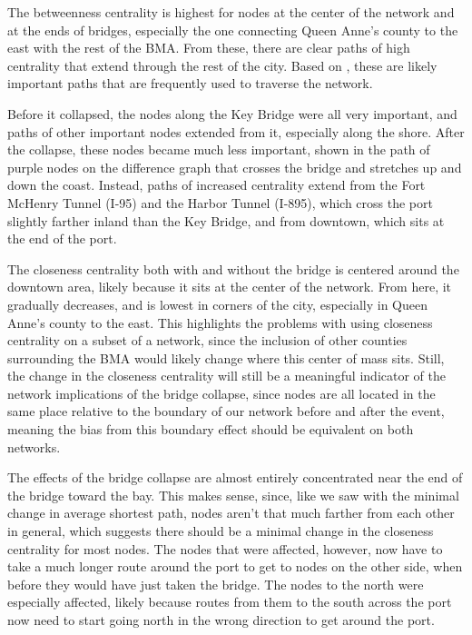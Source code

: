 \documentclass[11pt]{article}
\numberwithin{equation}{section} %
\numberwithin{figure}{section} %
\numberwithin{table}{section} %
\theoremstyle{definition}
\begin{document}
The betweenness centrality is highest for nodes at the center of the network and at the ends of bridges, especially the one connecting Queen Anne's county to the east with the rest of the BMA. From these, there are clear paths of high centrality that extend through the rest of the city. Based on \cite{Porta06}, these are likely important paths that are frequently used to traverse the network.

Before it collapsed, the nodes along the Key Bridge were all very important, and paths of other important nodes extended from it, especially along the shore. After the collapse, these nodes became much less important, shown in the path of purple nodes on the difference graph that crosses the bridge and stretches up and down the coast. Instead, paths of increased centrality extend from the Fort McHenry Tunnel (I-95) and the Harbor Tunnel (I-895), which cross the port slightly farther inland than the Key Bridge, and from downtown, which sits at the end of the port.

The closeness centrality both with and without the bridge is centered around the downtown area, likely because it sits at the center of the network. From here, it gradually decreases, and is lowest in corners of the city, especially in Queen Anne's county to the east. This highlights the problems with using closeness centrality on a subset of a network, since the inclusion of other counties surrounding the BMA would likely change where this center of mass sits. Still, the change in the closeness centrality will still be a meaningful indicator of the network implications of the bridge collapse, since nodes are all located in the same place relative to the boundary of our network before and after the event, meaning the bias from this boundary effect should be equivalent on both networks.

The effects of the bridge collapse are almost entirely concentrated near the end of the bridge toward the bay. This makes sense, since, like we saw with the minimal change in average shortest path, nodes aren't that much farther from each other in general, which suggests there should be a minimal change in the closeness centrality for most nodes. The nodes that were affected, however, now have to take a much longer route around the port to get to nodes on the other side, when before they would have just taken the bridge. The nodes to the north were especially affected, likely because routes from them to the south across the port now need to start going north in the wrong direction to get around the port.
\end{document}

